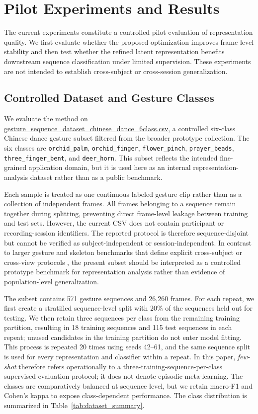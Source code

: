 \documentclass[11pt]{article}
\begin{document}
\section{Pilot Experiments and Results}
The current experiments constitute a controlled pilot evaluation of representation quality. We first evaluate whether the proposed optimization improves frame-level stability and then test whether the refined latent representation benefits downstream sequence classification under limited supervision. These experiments are not intended to establish cross-subject or cross-session generalization.

\subsection{Controlled Dataset and Gesture Classes}
We evaluate the method on \url{gesture_sequence_dataset_chinese_dance_6class.csv}, a controlled six-class Chinese dance gesture subset filtered from the broader prototype collection. The six classes are \texttt{orchid\_palm}, \texttt{orchid\_finger}, \texttt{flower\_pinch}, \texttt{prayer\_beads}, \texttt{three\_finger\_bent}, and \texttt{deer\_horn}. This subset reflects the intended fine-grained application domain, but it is used here as an internal representation-analysis dataset rather than as a public benchmark.

Each sample is treated as one continuous labeled gesture clip rather than as a collection of independent frames. All frames belonging to a sequence remain together during splitting, preventing direct frame-level leakage between training and test sets. However, the current CSV does not contain participant or recording-session identifiers. The reported protocol is therefore sequence-disjoint but cannot be verified as subject-independent or session-independent. In contrast to larger gesture and skeleton benchmarks that define explicit cross-subject or cross-view protocols \cite{shahroudy2016ntu,caputo2021shrec,kopuklu2020drivermhg,kapitanov2022hagrid}, the present subset should be interpreted as a controlled prototype benchmark for representation analysis rather than evidence of population-level generalization.

The subset contains 571 gesture sequences and 26,260 frames. For each repeat, we first create a stratified sequence-level split with 20\% of the sequences held out for testing. We then retain three sequences per class from the remaining training partition, resulting in 18 training sequences and 115 test sequences in each repeat; unused candidates in the training partition do not enter model fitting. This process is repeated 20 times using seeds 42--61, and the same sequence split is used for every representation and classifier within a repeat. In this paper, \emph{few-shot} therefore refers operationally to a three-training-sequence-per-class supervised evaluation protocol; it does not denote episodic meta-learning. The classes are comparatively balanced at sequence level, but we retain macro-F1 and Cohen's kappa to expose class-dependent performance. The class distribution is summarized in Table~\ref{tab:dataset_summary}.
\end{document}
